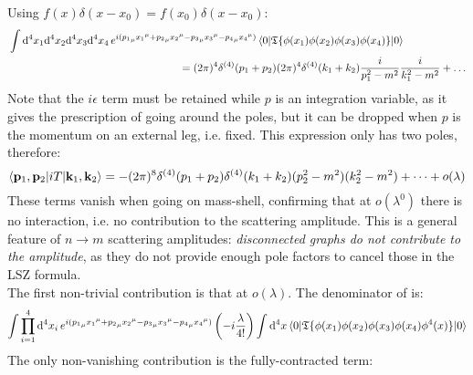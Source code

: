 Using $ f(x) \delta(x - x_0) = f(x_0) \delta(x - x_0) $:
\begin{equation*}
  \begin{split}
    & \int \mathrm{d}^4x_1 \mathrm{d}^4x_2 \mathrm{d}^4x_3 \mathrm{d}^4x_4\, e^{i ({p_1}_\mu {x_1}^\mu + {p_2}_\mu {x_2}^\mu - {p_3}_\mu {x_3}^\mu - {p_4}_\mu {x_4}^\mu)} \braket{0 | \mathfrak{T}\{\phi(x_1) \phi(x_2) \phi(x_3) \phi(x_4)\} | 0} \\
    & \qquad \qquad \qquad \qquad \qquad \qquad \qquad \qquad = (2\pi)^4 \delta^{(4)}(p_1 + p_2) (2\pi)^4 \delta^{(4)}(k_1 + k_2) \frac{i}{p_1^2 - m^2} \frac{i}{k_1^2 - m^2} + \dots
  \end{split}
\end{equation*}
Note that the $ i\epsilon $ term must be retained while $ p $ is an integration variable, as it gives the prescription of going around the poles, but it can be dropped when $ p $ is the momentum on an external leg, i.e. fixed. This expression only has two poles, therefore:
\begin{equation*}
  \braket{\mathbf{p}_1 , \mathbf{p}_2 | i T | \mathbf{k}_1 , \mathbf{k}_2} = - (2\pi)^8 \delta^{(4)}(p_1 + p_2) \delta^{(4)}(k_1 + k_2) (p_2^2 - m^2) (k_2^2 - m^2) + \dots + o(\lambda)
\end{equation*}
These terms vanish when going on mass-shell, confirming that at $ o(\lambda^0) $ there is no interaction, i.e. no contribution to the scattering amplitude. This is a general feature of $ n \rightarrow m $ scattering amplitudes: \textit{disconnected graphs do not contribute to the amplitude}, as they do not provide enough pole factors to cancel those in the LSZ formula. \\
The first non-trivial contribution is that at $ o(\lambda) $. The denominator of  is:
\begin{equation*}
  \int \prod_{i = 1}^4 \mathrm{d}^4x_i\, e^{i ({p_1}_\mu {x_1}^\mu + {p_2}_\mu {x_2}^\mu - {p_3}_\mu {x_3}^\mu - {p_4}_\mu {x_4}^\mu)} \left( - i \frac{\lambda}{4!} \right) \int \mathrm{d}^4x \braket{0 | \mathfrak{T}\{\phi(x_1) \phi(x_2) \phi(x_3) \phi(x_4) \phi^4(x)\} | 0}
\end{equation*}
The only non-vanishing contribution is the fully-contracted term:
